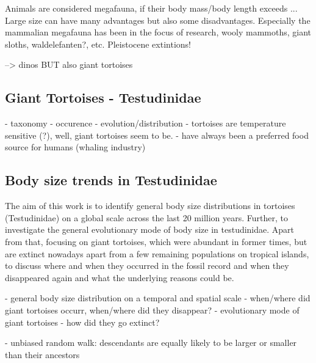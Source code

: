Animals are considered megafauna, if their body mass/body length exceeds ...
Large size can have many advantages but also some disadvantages.
Especially the mammalian megafauna has been in the focus of research, wooly mammoths, giant sloths, waldelefanten?, etc.
Pleistocene extintions!


--> dinos BUT also giant tortoises


\subsection{Giant Tortoises - Testudinidae}
- taxonomy
- occurence
- evolution/distribution
- tortoises are temperature sensitive (?), well, giant tortoises seem to be.
- have always been a preferred food source for humans (whaling industry)

\subsection{Body size trends in Testudinidae}

The aim of this work is to identify general body size distributions in tortoises (Testudinidae) on a global scale across the last 20 million years. Further, to investigate the general evolutionary mode of body size in testudinidae. Apart from that, focusing on giant tortoises, which were abundant in former times, but are extinct nowadays apart from a few remaining populations on tropical islands, to discuss where and when they occurred in the fossil record and when they disappeared again and what the underlying reasons could be.

- general body size distribution on a temporal and spatial scale
- when/where did giant tortoises occurr, when/where did they disappear?
- evolutionary mode of giant tortoises
- how did they go extinct?


- unbiased random walk: descendants are equally likely to be larger or smaller than their ancestors











































